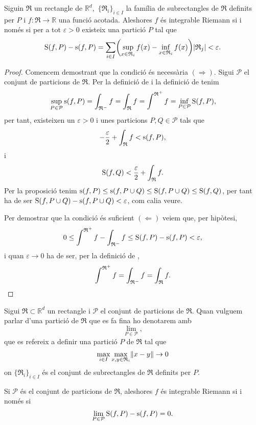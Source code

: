 \documentclass[../Apunts.tex]{subfiles}
\begin{document}
	\begin{theorem}
		\label{thm:Criteri d'integrabilitat Riemann}
		Siguin \(\mathfrak{R}\) un rectangle de \(\mathbb{R}^{d}\),\ \(\{\mathfrak{R}_{i}\}_{i\in I}\) la família de subrectangles de \(\mathfrak{R}\) definits per \(P\) i \(f\colon\mathfrak{R}\to\mathbb{R}\) una funció acotada. Aleshores \(f\) és integrable Riemann si i només si per a tot \(\varepsilon>0\) existeix una partició \(P\) tal que
		\[\Ssup(f,P)-\sinf(f,P)=\sum_{i\in I}\left(\sup_{x\in \mathfrak{R}_{i}}f(x)-\inf_{x\in \mathfrak{R}_{i}}f(x)\right)\abs{\mathfrak{R}_{j}}<\varepsilon.\]
		\begin{proof}
			Comencem demostrant que la condició és necessària \((\Rightarrow)\). Sigui \(\mathcal{P}\) el conjunt de particions de \(\mathfrak{R}\). Per la definició de  i la definició de  tenim
			\[\sup_{P\in\mathcal{P}}\operatorname{s}(f,P)=\int_{\mathfrak{R}^{-}}f=\int_{\mathfrak{R}}f=\int^{\mathfrak{R}^{+}}f=\inf_{P\in\mathcal{P}}\operatorname{S}(f,P),\]
			per tant, existeixen un \(\varepsilon>0\) i unes particions \(P,Q\in\mathcal{P}\) tals que
			\[-\frac{\varepsilon}{2}+\int_{\mathfrak{R}}f<\operatorname{s}(f,P),\]
			i
			\[\operatorname{S}(f,Q)<\frac{\varepsilon}{2}+\int_{\mathfrak{R}}f.\]
			Per la proposició  tenim \(\operatorname{s}(f,P)\leq\operatorname{s}(f,P\cup Q)\leq\operatorname{S}(f,P\cup Q)\leq\operatorname{S}(f,Q)\), per tant ha de ser \(\operatorname{S}(f,P\cup Q)-\operatorname{s}(f,P\cup Q)<\varepsilon\), com calia veure.
			
			Per demostrar que la condició és suficient \((\Leftarrow)\) veiem que, per hipòtesi,
			\[0\leq\int^{\mathfrak{R}^{+}}f-\int_{\mathfrak{R}^{-}}f\leq\operatorname{S}(f,P)-\operatorname{s}(f,P)<\varepsilon,\]
			i quan \(\varepsilon\to0\) ha de ser, per la definició de ,
			\[\int^{\mathfrak{R}^{+}}f=\int_{\mathfrak{R}^{-}}f=\int_{\mathfrak{R}}f.\qedhere\]
		\end{proof}
		\begin{notation}
			Sigui \(\mathfrak{R}\subset\mathbb{R}^{d}\) un rectangle i \(\mathcal{P}\) el conjunt de particions de \(\mathfrak{R}\).
			Quan vulguem parlar d'una partició de \(\mathfrak{R}\) que es fa fina ho denotarem amb
			\[\lim_{P\in\mathcal{P}},\]
			que es refereix a definir una partició \(P\) de \(\mathfrak{R}\) tal que
			\[\max_{i\in I}\max_{x,y\in \mathfrak{R}_{i}}\norm{x-y}\to0\]
			on \(\{\mathfrak{R}_{i}\}_{i\in I}\) és el conjunt de subrectangles de \(\mathfrak{R}\) definits per \(P\).
		\end{notation}
		\begin{corollary}\label{corollary:Sumes superior i inferior iguals integrable Riemann}
			Si \(\mathcal{P}\) és el conjunt de particions de \(\mathfrak{R}\), aleshores \(f\) és integrable Riemann si i només si
			\[\lim_{P\in\mathcal{P}}\operatorname{S}(f,P)-\operatorname{s}(f,P)=0.\]%
		\end{corollary}
	\end{theorem}
\end{document}
